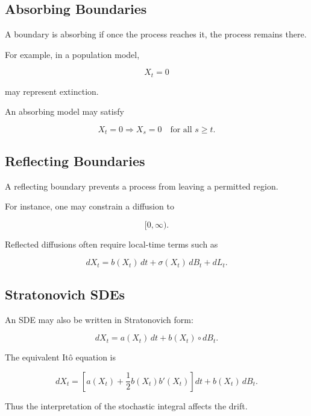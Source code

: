 \subsection{Absorbing Boundaries}
\label{subsec:absorbing-boundaries}

A boundary is absorbing if once the process reaches it, the process
remains there.

For example, in a population model,

\[
X_t=0
\]

may represent extinction.

An absorbing model may satisfy

\[
\boxed{
X_t=0
\Longrightarrow
X_s=0
\quad
\text{for all }s\geq t.
}
\]

\subsection{Reflecting Boundaries}
\label{subsec:reflecting-boundaries}

A reflecting boundary prevents a process from leaving a permitted
region.

For instance, one may constrain a diffusion to

\[
[0,\infty).
\]

Reflected diffusions often require local-time terms such as

\[
\boxed{
dX_t
=
b(X_t)\,dt
+
\sigma(X_t)\,dB_t
+
dL_t.
}
\]

\subsection{Stratonovich SDEs}
\label{subsec:stratonovich-sdes}

An SDE may also be written in Stratonovich form:

\[
\boxed{
dX_t
=
a(X_t)\,dt
+
b(X_t)\circ dB_t.
}
\]

The equivalent It\^o equation is

\[
\boxed{
dX_t
=
\left[
a(X_t)
+
\frac12
b(X_t)b'(X_t)
\right]dt
+
b(X_t)\,dB_t.
}
\]

Thus the interpretation of the stochastic integral affects the drift.


